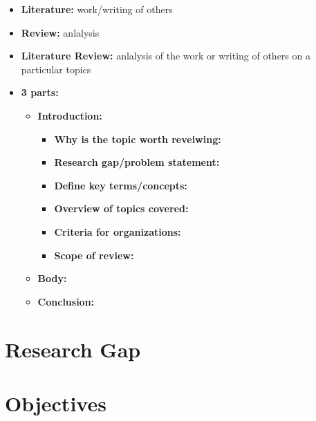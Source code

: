\documentclass[12pt]{book} %
\begin{document}
\begin{itemize}
    \item \textbf{Literature:} work/writing of others
    \item \textbf{Review:}  anlalysis
    \item \textbf{Literature Review:}  anlalysis of the work or writing of others on a particular topics
    \item \textbf{3 parts:}  
    \begin{itemize}
        \item \textbf{Introduction:} 
            \begin{itemize}
                \item \textbf{Why is the topic worth reveiwing:} 
                \item \textbf{Research gap/problem statement:} 
                \item \textbf{Define key terms/concepts:} 
                \item \textbf{Overview of topics covered:} 
                \item \textbf{Criteria for organizations:} 
                \item \textbf{Scope of review:} 
            \end{itemize}
        \item \textbf{Body:}  
        \item \textbf{Conclusion:}  
    \end{itemize}
\end{itemize}



\section{Research Gap}
\section{Objectives}






\end{document}
